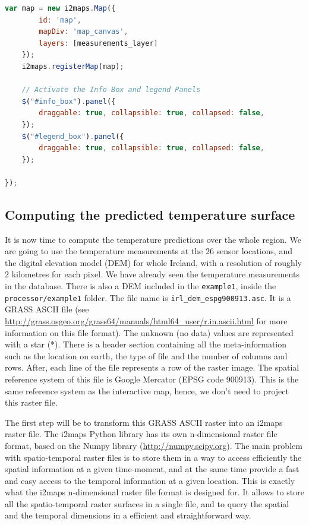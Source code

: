 \documentclass[11pt]{article}
\begin{document}
\begin{lstlisting}[language=JavaScript]
    var map = new i2maps.Map({
        id: 'map',
        mapDiv: 'map_canvas',
        layers: [measurements_layer]
    });
    i2maps.registerMap(map);
    
    // Activate the Info Box and legend Panels
    $("#info_box").panel({
        draggable: true, collapsible: true, collapsed: false,
    });
    $("#legend_box").panel({
        draggable: true, collapsible: true, collapsed: false,
    });
    
});
\end{lstlisting}




\subsection{Computing the predicted temperature surface}

It is now time to compute the temperature predictions over the whole region. We are going to use the temperature measurements at the 26 sensor locations, and the digital elevation model (DEM) for whole Ireland, with a resolution of roughly 2 kilometres for each pixel. We have already seen the temperature measurements in the database. There is also a DEM included in the \texttt{example1}, inside the \texttt{processor/example1} folder. The file name is \texttt{irl\_dem\_espg900913.asc}. It is a GRASS ASCII file (see \url{http://grass.osgeo.org/grass64/manuals/html64_user/r.in.ascii.html} for more information on this file format). The unknown (no data) values are represented with a star (*). There is a header section containing all the meta-information such as the location on earth, the type of file and the number of columns and rows. After, each line of the file represents a row of the raster image. The spatial reference system of this file is Google Mercator (EPSG code 900913). This is the same reference system as the interactive map, hence, we don't need to project this raster file.

The first step will be to transform this GRASS ASCII raster into an i2maps raster file. The i2maps Python library has its own n-dimensional raster file format, based on the Numpy library (\url{http://numpy.scipy.org}). The main problem with spatio-temporal raster files is to store them in a way to access efficiently the spatial information at a given time-moment, and at the same time provide a fast and easy access to the temporal information at a given location. This is exactly what the i2maps n-dimensional raster file format is designed for. It allows to store all the spatio-temporal raster surfaces in a single file, and to query the spatial and the temporal dimensions in a efficient and straightforward way.
\end{document}
